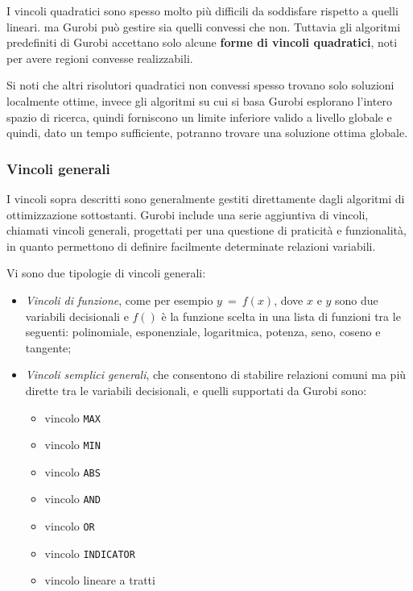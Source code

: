 I vincoli quadratici sono spesso molto più difficili da soddisfare rispetto a quelli lineari. ma Gurobi può gestire sia quelli convessi che non.
Tuttavia gli algoritmi predefiniti di Gurobi accettano solo alcune \textbf{forme di vincoli quadratici}, noti per avere regioni convesse realizzabili.

Si noti che altri risolutori quadratici non convessi spesso trovano solo soluzioni localmente ottime, invece gli algoritmi su cui si basa Gurobi esplorano l'intero spazio di ricerca, quindi forniscono un limite inferiore valido a livello globale e quindi, dato un tempo sufficiente, potranno trovare una soluzione ottima globale.

\subsubsection*{Vincoli generali}
I vincoli sopra descritti sono generalmente gestiti direttamente dagli algoritmi di ottimizzazione sottostanti. Gurobi include una serie aggiuntiva di vincoli, chiamati vincoli generali, progettati per una questione di praticità e funzionalità, in quanto permettono di definire facilmente determinate relazioni variabili.

Vi sono due tipologie di vincoli generali:
\begin{itemize}
\item \textit{Vincoli di funzione}, come per esempio $y ~ = ~ f(x)$, dove $x$ e $y$ sono due variabili decisionali e $f()$ è la funzione scelta in una lista di funzioni tra le seguenti: polinomiale, esponenziale, logaritmica, potenza, seno, coseno e tangente;
\item \textit{Vincoli semplici generali}, che consentono di stabilire relazioni comuni ma più dirette tra le variabili decisionali, e quelli supportati da Gurobi sono:
\begin{itemize}
\item vincolo \texttt{MAX}
\item vincolo \texttt{MIN}
\item vincolo \texttt{ABS}
\item vincolo \texttt{AND}
\item vincolo \texttt{OR}
\item vincolo \texttt{INDICATOR}
\item vincolo lineare a tratti
\end{itemize}
\end{itemize}

